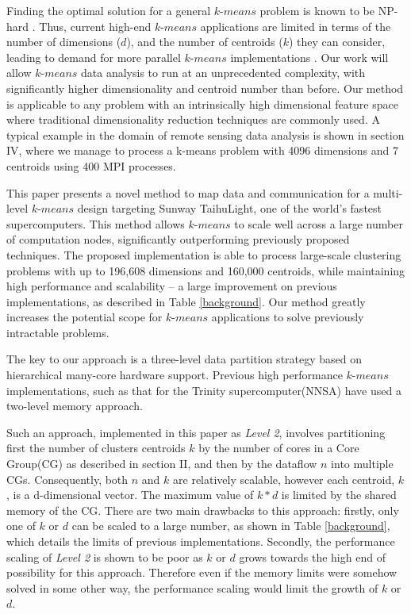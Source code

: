 \documentclass[10pt,journal,compsoc]{IEEEtran}
\begin{document}
Finding the optimal solution for a general $k$-$means$ problem is known to be NP-hard \cite{dasgupta2008hardness}. Thus, current high-end $k$-$means$ applications are limited in terms of the number of dimensions ($d$), and the number of centroids ($k$) they can consider, leading to demand for more parallel $k$-$means$ implementations \cite{kumar2011parallel,bender2015k}. Our work will allow $k$-$means$ data analysis to run at an unprecedented complexity, with significantly higher dimensionality and centroid number than before. Our method is applicable to any problem with an intrinsically high dimensional feature space where traditional dimensionality reduction techniques are commonly used.
A typical example in the domain of remote sensing data analysis is shown in section IV, where we manage to process a k-means problem with 4096 dimensions and 7 centroids using 400 MPI processes.

This paper presents a novel method to map data and communication for a multi-level $k$-$means$ design targeting Sunway TaihuLight, one of the world's fastest supercomputers. This method allows $k$-$means$ to scale well across a large number of computation nodes, significantly outperforming previously proposed techniques. The proposed implementation is able to  process large-scale clustering problems with up to 196,608 dimensions and 160,000  centroids, while maintaining high performance and scalability -- a large improvement on previous implementations, as described in Table \ref{background}.  Our method greatly increases the potential scope for $k$-$means$ applications to solve previously intractable problems.

The key to our approach is a three-level data partition strategy based on hierarchical many-core hardware support. Previous high performance $k$-$means$ implementations, such as that for the Trinity supercomputer(NNSA)\cite{bender2015k} have used a two-level memory approach. 

Such an approach, implemented in this paper as \textit{Level 2}, involves partitioning first the number of clusters centroids $k$ by the number of cores in a Core Group(CG) as described in section II, and then by the dataflow $n$ into multiple CGs. Consequently, both $n$ and $k$ are relatively scalable, however each centroid, $k$, is a d-dimensional vector. The maximum value of $k*d$ is limited by the shared memory of the CG. There are two main drawbacks to this approach: firstly, only one of $k$ or $d$ can be scaled to a large number, as shown in Table \ref{background}, which details the limits of previous implementations. Secondly, the performance scaling of \textit{Level 2} is shown to be poor as $k$ or $d$ grows towards the high end of possibility for this approach. Therefore even if the memory limits were somehow solved in some other way, the performance scaling would limit the growth of $k$ or $d$.
\end{document}
